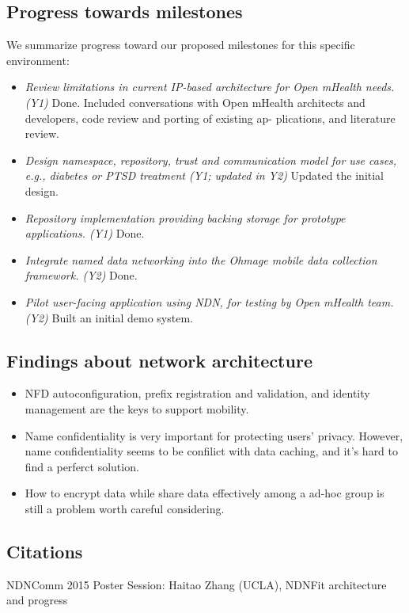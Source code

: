 \documentclass{article}
\begin{document}
\subsection{Progress towards milestones}
We summarize progress toward our proposed milestones for this specific environment:
\begin{itemize}
	\item \textit{Review limitations in current IP-based architecture for Open mHealth needs. (Y1)} Done. Included conversations with Open mHealth architects and developers, code review and porting of existing ap- plications, and literature review. 
	\item \textit{Design namespace, repository, trust and communication model for use cases, e.g., diabetes or PTSD treatment (Y1; updated in Y2)} Updated the initial design.
	\item \textit {Repository implementation providing backing storage for prototype applications. (Y1)} Done.
	\item \textit {Integrate named data networking into the Ohmage mobile data collection framework. (Y2)} Done.
	\item \textit {Pilot user-facing application using NDN, for testing by Open mHealth team. (Y2)} Built an initial demo system.
\end{itemize}

\subsection{Findings about network architecture }
\begin{itemize}
	\item NFD autoconfiguration, prefix registration and validation, and identity management are the keys to support mobility.
	\item Name confidentiality is very important for protecting users' privacy. However, name confidentiality seems to be confilict with data caching, and it's hard to find a perferct solution.
	\item How to encrypt data while share data effectively among a ad-hoc group is still a problem worth careful considering.
\end{itemize}

\subsection{Citations}
NDNComm 2015 Poster Session: Haitao Zhang (UCLA), NDNFit architecture and progress



\end{document}

